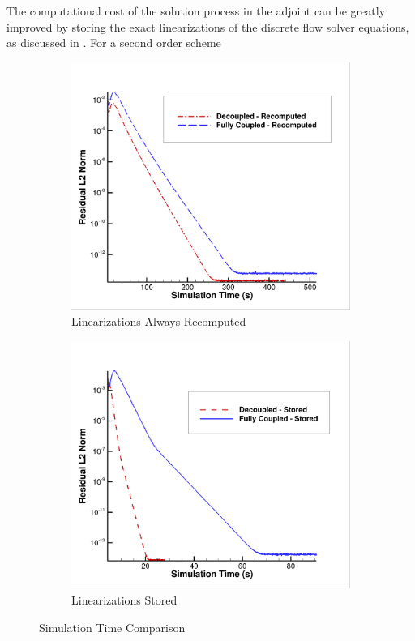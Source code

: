 The computational cost of the solution process in the adjoint can be greatly
improved by storing the exact linearizations of the discrete flow solver
equations, as discussed in .  For a second order
scheme 
\begin{figure}[h]
	\begin{subfigure}[b]{0.45\textwidth}
    \centering
    \includegraphics[width=\textwidth]{figures/adj-efficiency/adj-recompute.png}
    \caption{Linearizations Always Recomputed}
    \label{fig:always-recompute}
  \end{subfigure}
	\begin{subfigure}[b]{0.45\textwidth}
    \centering
    \includegraphics[width=\textwidth]{figures/adj-efficiency/adj-stored.png}
    \caption{Linearizations Stored}
    \label{fig:stored}
  \end{subfigure}
  \caption{Simulation Time Comparison}
  \label{fig:sim-time-comp}
\end{figure}
